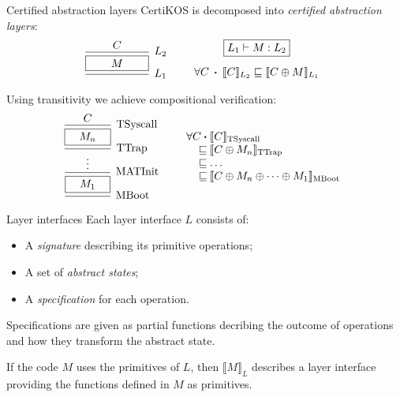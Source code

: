 \documentclass{beamer}
\newcommand{\kw}[1]{\ensuremath{ \mathrm{#1} }}
\newcommand{\bdot}{\boldsymbol{\cdot}}
\begin{document}
\begin{frame}{Certified abstraction layers} %
  CertiKOS is decomposed into
  \emph{certified abstraction layers}:
  \[
    \begin{prooftree}
      \hypo{C}
      \infer1[$L_2$]{\fbox{$\qquad M \qquad$}}
      \infer1[$L_1$]{}
    \end{prooftree}
    \qquad
    \begin{array}{c}
      \fbox{$L_1 \vdash M : L_2$} \\[1em]
      \forall C \: \bdot \:
      \llbracket C \rrbracket_{L_2} \sqsubseteq
      \llbracket C \oplus M \rrbracket_{L_1}
    \end{array}
  \]

  \pause
  Using transitivity we achieve compositional verification:
  \[
    \begin{prooftree}
      \hypo{C}
      \infer1[\kw{TSyscall}]{\fbox{$\quad M_n \quad$}}
      \infer1[\kw{TTrap}]{\vdots}
      \infer1[\kw{MATInit}]{\fbox{$\quad M_1 \quad$}}
      \infer1[\kw{MBoot}]{}
    \end{prooftree}
    \qquad
    \begin{array}{r@{\:}l}
      \forall C \: \bdot &
      \llbracket C \rrbracket_\kw{TSyscall} \\
      \sqsubseteq &
      \llbracket C \oplus M_n \rrbracket_\kw{TTrap} \\
      \sqsubseteq &
      \ldots \\
      \sqsubseteq &
      \llbracket C \oplus M_n \oplus \cdots \oplus M_1
      \rrbracket_\kw{MBoot}
    \end{array}
  \]
\end{frame}

\begin{frame}{Layer interfaces} %
  Each layer interface $L$ consists of:
  \begin{itemize}
    \pause \item
      A \emph{signature} describing its primitive operations;
    \pause \item
      A set of \emph{abstract states};
    \pause \item
      A \emph{specification} for each operation.
  \end{itemize}

  \pause
  Specifications are given as partial functions
  decribing the outcome of operations
  and how they transform the abstract state.

  \pause
  If the code $M$ uses the primitives of $L$,
  then $\llbracket M \rrbracket_L$ describes a layer interface
  providing the functions defined in $M$ as primitives.
\end{frame}
\end{document}

